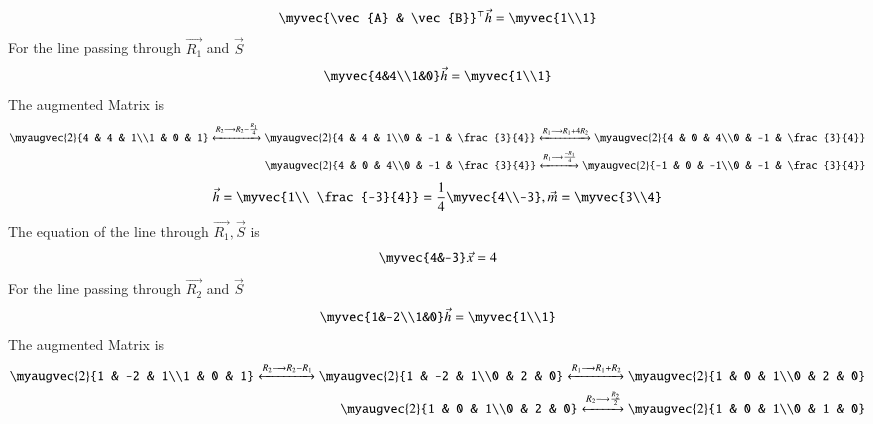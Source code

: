 \documentclass[journal]{IEEEtran}
\begin{document}
\begin{align}
\myvec{\vec{A} & \vec{B}}^\top\vec{h} = \myvec{1\\1}
\end{align}
For the line passing through $\vec{R_1}$ and $\vec{S}$
\begin{align}
\myvec{4&4\\1&0}\vec{h} = \myvec{1\\1}
\end{align}
The augmented Matrix is
\begin{align}
  \myaugvec{2}{4 & 4 & 1\\1 & 0 & 1} \xleftrightarrow{R_2 \longrightarrow R_2-\frac{R_1}{4}} 
  \myaugvec{2}{4 & 4 & 1\\0 & -1 & \frac{3}{4}} \xleftrightarrow{R_1 \longrightarrow R_1+4R_2}
\myaugvec{2}{4 & 0 & 4\\0 & -1 & \frac{3}{4}} \\
\myaugvec{2}{4 & 0 & 4\\0 & -1 & \frac{3}{4}} \xleftrightarrow{R_1 \longrightarrow \frac{-R_1}{4}} \myaugvec{2}{-1 & 0 & -1\\0 & -1 & \frac{3}{4}}
\end{align}
\begin{align}
\vec{h} = \myvec{1\\ \frac{-3}{4}} = \frac{1}{4}\myvec{4\\-3} , \vec{m} = \myvec{3\\4}
\end{align}
The equation of the line through $\vec{R_1},\vec{S}$ is
\begin{align}
\myvec{4&-3}\vec{x} = 4  \label{eq: line1}
\end{align}
For the line passing through $\vec{R_2}$ and $\vec{S}$
\begin{align}
\myvec{1&-2\\1&0}\vec{h} = \myvec{1\\1}
\end{align}
The augmented Matrix is
\begin{align}
  \myaugvec{2}{1 & -2 & 1\\1 & 0 & 1} \xleftrightarrow{R_2 \longrightarrow R_2-R_1} 
  \myaugvec{2}{1 & -2 & 1\\0 & 2 & 0} \xleftrightarrow{R_1 \longrightarrow R_1+R_2}
\myaugvec{2}{1 & 0 & 1\\0 & 2 & 0} \\
\myaugvec{2}{1 & 0 & 1\\0 & 2 & 0} \xleftrightarrow{R_2 \longrightarrow \frac{R_2}{2}} \myaugvec{2}{1 & 0 & 1\\0 & 1 & 0}
\end{align}
\end{document}
